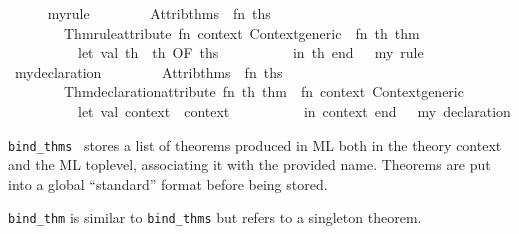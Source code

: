 \begin{isabellebody}
\begin{isamarkuptext}
\begin{description}
  \end{description}%
\end{isamarkuptext}%
\isamarkuptrue%
%
\isadelimML
\ \ \ \ %
\endisadelimML
%
\isatagML
{}\isamarkupfalse%
\ my{\isacharunderscore}rule\ {\isacharequal}\ {\isacharverbatimopen}\isanewline
\ \ \ \ \ \ Attrib{\isachardot}thms\ {\isachargreater}{\isachargreater}\ {\isacharparenleft}fn\ ths\ {\isacharequal}{\isachargreater}\isanewline
\ \ \ \ \ \ \ \ Thm{\isachardot}rule{\isacharunderscore}attribute\ {\isacharparenleft}fn\ context{\isacharcolon}\ Context{\isachardot}generic\ {\isacharequal}{\isachargreater}\ fn\ th{\isacharcolon}\ thm\ {\isacharequal}{\isachargreater}\isanewline
\ \ \ \ \ \ \ \ \ \ let\ val\ th{\isacharprime}\ {\isacharequal}\ th\ OF\ ths\isanewline
\ \ \ \ \ \ \ \ \ \ in\ th{\isacharprime}\ end{\isacharparenright}{\isacharparenright}\ {\isacharverbatimclose}\ \ {\isachardoublequoteopen}my\ rule{\isachardoublequoteclose}\isanewline
\isanewline
\ \ \ \ \isamarkupfalse%
\ my{\isacharunderscore}declaration\ {\isacharequal}\ {\isacharverbatimopen}\isanewline
\ \ \ \ \ \ Attrib{\isachardot}thms\ {\isachargreater}{\isachargreater}\ {\isacharparenleft}fn\ ths\ {\isacharequal}{\isachargreater}\isanewline
\ \ \ \ \ \ \ \ Thm{\isachardot}declaration{\isacharunderscore}attribute\ {\isacharparenleft}fn\ th{\isacharcolon}\ thm\ {\isacharequal}{\isachargreater}\ fn\ context{\isacharcolon}\ Context{\isachardot}generic\ {\isacharequal}{\isachargreater}\isanewline
\ \ \ \ \ \ \ \ \ \ let\ val\ context{\isacharprime}\ {\isacharequal}\ context\isanewline
\ \ \ \ \ \ \ \ \ \ in\ context{\isacharprime}\ end{\isacharparenright}{\isacharparenright}\ {\isacharverbatimclose}\ \ {\isachardoublequoteopen}my\ declaration{\isachardoublequoteclose}%
\endisatagML
{\isafoldML}%
%
\isadelimML
%
\endisadelimML
%
\begin{isamarkuptext}%
\begin{description}

  \item \verb|bind_thms|~ stores a list of
  theorems produced in ML both in the theory context and the ML
  toplevel, associating it with the provided name.  Theorems are put
  into a global ``standard'' format before being stored.

  \item \verb|bind_thm| is similar to \verb|bind_thms| but refers to a
  singleton theorem.
  

\end{description}
\end{isamarkuptext}
\end{isabellebody}
